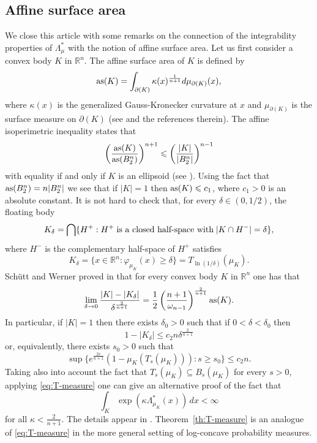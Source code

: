 \documentclass[11pt,leqno]{article}
\theoremstyle{definition}
\theoremstyle{remark}
\numberwithin{equation}{section}
\newcommand{\ls}{\leqslant}
\newcommand{\gr}{\geqslant}
\newcommand{\1}{\textbf{1}}
\begin{document}
\subsection{Affine surface area}\label{subsection-4.3}

We close this article with some remarks on the connection of the integrability properties of $\Lambda_{\mu}^{\ast}$
with the notion of affine surface area. Let us first consider a convex body $K$ in ${\mathbb R}^n$. The affine surface area
of $K$ is defined by
$${\rm as}(K)=\int_{\partial(K)}\kappa(x)^{\frac{1}{n+1}}d\mu_{\partial(K)}(x),$$
where $\kappa(x)$ is the generalized Gauss-Kronecker curvature at $x$ and $\mu_{\partial(K)}$ is the surface measure on
$\partial(K)$ (see \cite{Nagy-Schutt-Werner-2019} and the references therein). The affine isoperimetric inequality states that
$$\left(\frac{{\rm as}(K)}{{\rm as}(B_2^n)}\right)^{n+1}\ls \left(\frac{|K|}{|B_2^n|}\right)^{n-1}$$
with equality if and only if $K$ is an ellipsoid (see \cite[Section~10.5]{Schneider-book}).
Using the fact that ${\rm as}(B_2^n)=n|B_2^n|$ we see that if $|K|=1$ then ${\rm as}(K)\ls c_1$, where
$c_1>0$ is an absolute constant. It is not hard to check that, for every $\delta\in (0,1/2)$, the floating body
$$K_{\delta}=\bigcap\{H^+:H^+\;\hbox{is a closed half-space with}\;|K\cap H^-|=\delta\},$$
where $H^-$ is the complementary half-space of $H^+$ satisfies
$$K_{\delta}=\{x\in\mathbb{R}^n:\varphi_{\mu_K}(x)\gr\delta\}=T_{\ln(1/\delta)}(\mu_K).$$
Sch\"{u}tt and Werner proved in \cite{Schutt-Werner-1990} that for every convex body $K$ in ${\mathbb R}^n$ one has that
$$\lim_{\delta\to 0}\frac{|K|-|K_{\delta}|}{\delta^{\frac{2}{n+1}}}=\frac{1}{2}\left(\frac{n+1}{\omega_{n-1}}\right)^{\frac{2}{n+1}}
{\rm as}(K).$$
In particular, if $|K|=1$ then there exists $\delta_0>0$ such that if $0<\delta <\delta_0$ then
$$1-|K_{\delta}|\ls c_2n\delta^{\frac{2}{n+1}}$$
or, equivalently, there exists $s_0>0$ such that
\begin{equation}\label{eq:T-measure}\sup\{e^{\frac{2s}{n+1}}(1-\mu_K(T_s(\mu_K))):s\gr s_0\}\ls c_2n.\end{equation}
Taking also into account the fact that $T_s(\mu_K)\subseteq B_s(\mu_K)$
for every $s>0$, applying \eqref{eq:T-measure} one can give an alternative proof of the fact that
$$\int_K\exp(\kappa\Lambda_{\mu_K}^{\ast}(x))\,dx <\infty$$
for all $\kappa<\frac{2}{n+1}$. The details appear in \cite[Theorem~6.5]{Giannopoulos-2025}. Theorem~\ref{th:T-measure} is an analogue
of \eqref{eq:T-measure} in the more general setting of log-concave probability measures.
\end{document}
